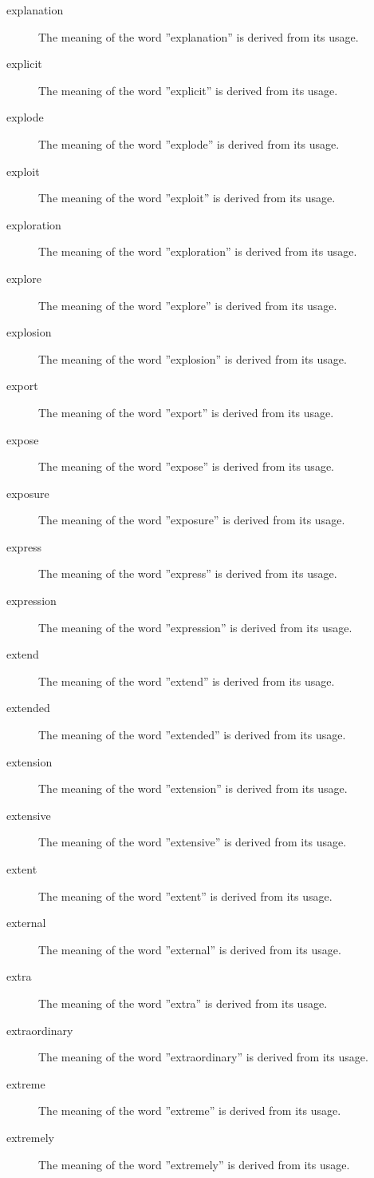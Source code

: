 \documentclass[12pt, letterpaper]{memoir}
\begin{document}
\begin{description}
\item[explanation] The meaning of the word ''explanation'' is derived from its usage.
\item[explicit] The meaning of the word ''explicit'' is derived from its usage.
\item[explode] The meaning of the word ''explode'' is derived from its usage.
\item[exploit] The meaning of the word ''exploit'' is derived from its usage.
\item[exploration] The meaning of the word ''exploration'' is derived from its usage.
\item[explore] The meaning of the word ''explore'' is derived from its usage.
\item[explosion] The meaning of the word ''explosion'' is derived from its usage.
\item[export] The meaning of the word ''export'' is derived from its usage.
\item[expose] The meaning of the word ''expose'' is derived from its usage.
\item[exposure] The meaning of the word ''exposure'' is derived from its usage.
\item[express] The meaning of the word ''express'' is derived from its usage.
\item[expression] The meaning of the word ''expression'' is derived from its usage.
\item[extend] The meaning of the word ''extend'' is derived from its usage.
\item[extended] The meaning of the word ''extended'' is derived from its usage.
\item[extension] The meaning of the word ''extension'' is derived from its usage.
\item[extensive] The meaning of the word ''extensive'' is derived from its usage.
\item[extent] The meaning of the word ''extent'' is derived from its usage.
\item[external] The meaning of the word ''external'' is derived from its usage.
\item[extra] The meaning of the word ''extra'' is derived from its usage.
\item[extraordinary] The meaning of the word ''extraordinary'' is derived from its usage.
\item[extreme] The meaning of the word ''extreme'' is derived from its usage.
\item[extremely] The meaning of the word ''extremely'' is derived from its usage.

\end{description}
\end{document}
